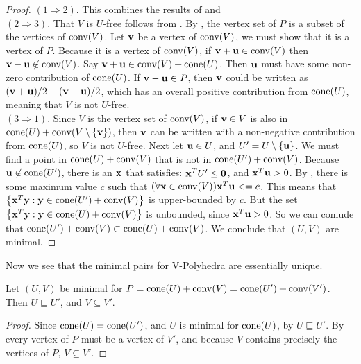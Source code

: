 \begin{proof}
	$(1 \Rightarrow 2)$.  This combines the results of  and \\
	$(2 \Rightarrow 3)$.  That $V$ is $U$-free follows from .  By , the vertex set of $P$ is a subset of the vertices of $\operatorname{conv}(V)$.  Let $\mathbf{v}$ be a vertex of $\operatorname{conv}(V)$, we must show that it is a vertex of $P$.  Because it is a vertex of $\operatorname{conv}(V)$, if $\mathbf{v}+\mathbf{u}\in\operatorname{conv}(V)$ then $\mathbf{v}-\mathbf{u}\not\in\operatorname{conv}(V)$.  Say $\mathbf{v}+\mathbf{u}\in\operatorname{conv}(V)+\operatorname{cone}(U)$.  Then $\mathbf{u}$ must have some non-zero contribution of $\operatorname{cone}(U)$.  If $\mathbf{v}-\mathbf{u}\in P$, then $\mathbf{v}$ could be written as $(\mathbf{v}+\mathbf{u})/2 + (\mathbf{v}-\mathbf{u})/2$, which has an overall positive contribution from $\operatorname{cone}(U)$, meaning that $V$ is not $U$-free.\\
	$(3 \Rightarrow 1)$.  Since $V$ is the vertex set of $\operatorname{conv}(V)$, if $\mathbf{v}\in V$ is also in $\operatorname{cone}(U) + \operatorname{conv}(V\setminus\left\{\mathbf{v}\right\})$, then $\mathbf{v}$ can be written with a non-negative contribution from $\operatorname{cone}(U)$, so $V$ is not $U$-free.  Next let $\mathbf{u}\in U$, and $U'=U\setminus\left\{\mathbf{u}\right\}$.  We must find a point in $\operatorname{cone}(U) + \operatorname{conv}(V)$ that is not in $\operatorname{cone}(U') + \operatorname{conv}(V)$.  Because $\mathbf{u} \not\in\operatorname{cone}(U')$, there is an $\mathbf{x}$ that satisfies: $\mathbf{x}^T U' \leq \mathbf{0}$, and $\mathbf{x}^T \mathbf{u} > 0$.  By , there is some maximum value $c$ such that $(\forall \mathbf{x}\in\operatorname{conv}(V)) \mathbf{x}^T \mathbf{u} <= c$.  This means that $\left\{\mathbf{x}^T \mathbf{y} : \mathbf{y} \in \operatorname{cone}(U') + \operatorname{conv}(V)\right\}$ is upper-bounded by $c$.  But the set $\left\{\mathbf{x}^T \mathbf{y} : \mathbf{y} \in \operatorname{cone}(U) + \operatorname{conv}(V)\right\}$ is unbounded, since $\mathbf{x}^T \mathbf{u} > 0$.  So we can conlude that $\operatorname{cone}(U') + \operatorname{conv}(V) \subset \operatorname{cone}(U) + \operatorname{conv}(V)$.  We conclude that $(U,V)$ are minimal.
\end{proof}

Now we see that the minimal pairs for V-Polyhedra are essentially unique.

\begin{Prop}
	Let $(U,V)$ be minimal for $P = \operatorname{cone}(U) + \operatorname{conv}(V) = \operatorname{cone}(U') + \operatorname{conv}(V')$.  Then $U\sqsubseteq U'$, and $V\subseteq V'$.
\end{Prop}

\begin{proof}
	Since $\operatorname{cone}(U) = \operatorname{cone}(U')$, and $U$ is minimal for $\operatorname{cone}(U)$, by  $U\sqsubseteq U'$.  By  every vertex of $P$ must be a vertex of $V'$, and because $V$ contains precisely the vertices of $P$, $V\subseteq V'$.
\end{proof}

